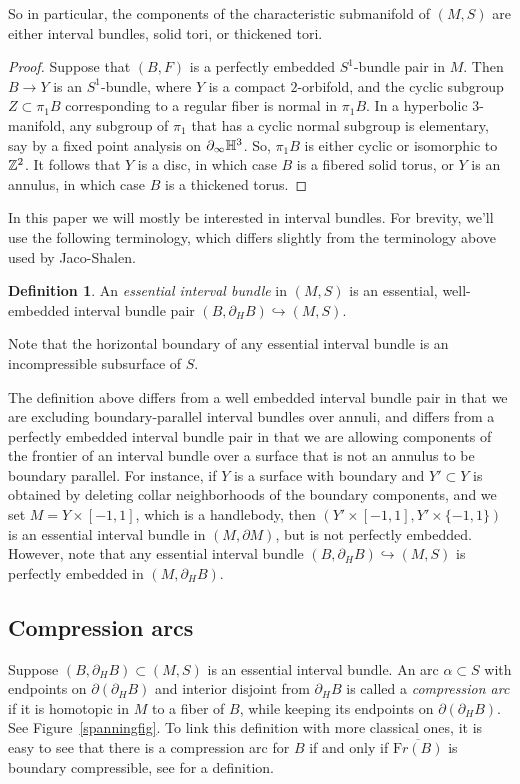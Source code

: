 \documentclass[12pt]{amsart}
\theoremstyle{definition}
\newtheorem{definition}[theorem]{Definition}
\theoremstyle{remark}
\begin{document}
So in particular, the components of the characteristic submanifold of $(M,S)$ are either interval bundles, solid tori, or thickened tori.

\begin{proof}
Suppose that  $(B,F)$ is a perfectly embedded $S^1$-bundle pair in $M$. Then $B \longrightarrow Y$ is an $S^1$-bundle, where $Y$ is a compact $2$-orbifold, and the cyclic subgroup $Z \subset \pi_1 B$ corresponding to a regular fiber is normal in $\pi_1 B$. In a hyperbolic $3$-manifold, any subgroup of $\pi_1$ that has a cyclic normal subgroup is elementary, say by a fixed point analysis on $\partial_\infty \mathbb H^3$. So, $\pi_1 B $ is either cyclic or isomorphic to $\mathbb Z^2$. It follows that $Y$ is a disc, in which case $B$ is a fibered solid torus, or $Y$ is an annulus, in which case $B$ is a thickened torus.
\end{proof}

In this paper we will mostly be interested in interval bundles. For brevity, we'll use the following terminology, which differs slightly from the terminology above used by Jaco-Shalen.

\begin{definition}
An \emph{essential interval bundle} in $(M,S)$ is an essential, well-embedded interval bundle pair $(B,\partial_H B)\hookrightarrow (M,S)$. 
\end{definition}

Note that the horizontal boundary of any essential interval bundle is an incompressible subsurface of $S$.

The definition above differs from a well embedded interval bundle pair in that we are excluding boundary-parallel interval bundles over annuli, and differs from a perfectly embedded interval bundle pair in that we are allowing components of the frontier of an interval bundle over a surface that is not an annulus to be boundary parallel. For instance, if $Y$ is a surface with boundary and $Y'\subset Y$ is obtained by deleting collar neighborhoods of the boundary components, and we set $M=Y\times [-1,1]$, which is a handlebody, then $(Y'\times [-1,1],Y'\times \{-1,1\})$ is an essential interval bundle in $(M,\partial M)$, but is not perfectly embedded. However, note that any essential interval bundle $(B,\partial_H B)\hookrightarrow (M,S)$ is perfectly embedded in $(M,\partial_H B)$.

 \subsection{Compression arcs}
\label{compressionsec}
Suppose $(B,\partial_H B) \subset (M,S)$ is an essential interval bundle. An arc $\alpha \subset S $ with endpoints on $\partial (\partial_H B)$ and interior disjoint from $\partial_H B$ is called  a \emph{compression arc} if it is homotopic in $M$ to a fiber of $B$, while keeping its endpoints on  $\partial(\partial_HB)$. See Figure~\ref{spanningfig}. 
To link this definition with more classical ones, it is easy to see that there is a compression arc for $B$ if and only if $\overline{{\mathrm Fr}(B)}$ is boundary compressible, see \cite[pp.36--37]{Jacolectures} for a definition.
\end{document}
